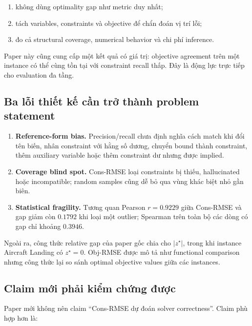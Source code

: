 \documentclass[11pt,a4paper]{article}
\begin{document}
\begin{enumerate}
  \item không dùng optimality gap như metric duy nhất;
  \item tách variables, constraints và objective để chẩn đoán vị trí lỗi;
  \item đo cả structural coverage, numerical behavior và chi phí inference.
\end{enumerate}

Paper này cũng cung cấp một kết quả có giá trị: objective agreement trên một instance có thể cùng tồn tại với constraint recall thấp. Đây là động lực trực tiếp cho evaluation đa tầng.

\subsection{Ba lỗi thiết kế cần trở thành problem statement}

\begin{evidencebox}
\begin{enumerate}
  \item \textbf{Reference-form bias.} Precision/recall chưa định nghĩa cách match khi đổi tên biến, nhân constraint với hằng số dương, chuyển bound thành constraint, thêm auxiliary variable hoặc thêm constraint dư nhưng được implied.
  \item \textbf{Coverage blind spot.} Cons-RMSE loại constraints bị thiếu, hallucinated hoặc incompatible; random samples cũng dễ bỏ qua vùng khác biệt nhỏ gần biên.
  \item \textbf{Statistical fragility.} Tương quan Pearson \(r=0.9229\) giữa Cons-RMSE và gap giảm còn \(0.1792\) khi loại một outlier; Spearman trên toàn bộ các dòng có gap chỉ khoảng \(0.3946\).
\end{enumerate}
\end{evidencebox}

Ngoài ra, công thức relative gap của paper gốc chia cho \(|z^\star|\), trong khi instance Aircraft Landing có \(z^\star=0\). Obj-RMSE được mô tả như functional comparison nhưng công thức lại so sánh optimal objective values giữa các instances.

\subsection{Claim mới phải kiểm chứng được}

Paper mới không nên claim ``Cons-RMSE dự đoán solver correctness''. Claim phù hợp hơn là:
\end{document}

